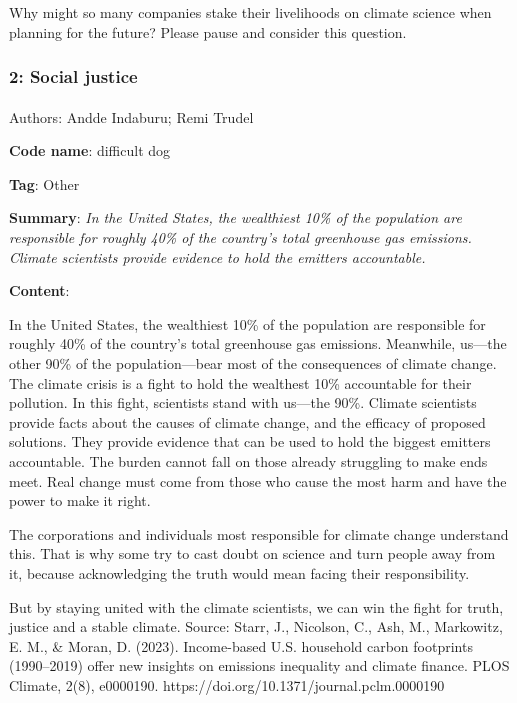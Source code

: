 \documentclass[
  letterpaper,
  DIV=11,
  numbers=noendperiod]{scrartcl}
\makeatletter
\let\oldparagraph\paragraph
\renewcommand{\paragraph}{
    \@ifstar
      \xxxParagraphStar
      \xxxParagraphNoStar
  }
\newcommand{\xxxParagraphStar}[1]{\oldparagraph*{#1}\mbox{}}
\newcommand{\xxxParagraphNoStar}[1]{\oldparagraph{#1}\mbox{}}
\makeatother
\begin{document}
Why might so many companies stake their livelihoods on climate science
when planning for the future? Please pause and consider this question.

\subsubsection{2: Social justice}\label{social-justice}

\paragraph{Authors: Andde Indaburu; Remi
Trudel}\label{authors-andde-indaburu-remi-trudel}

\textbf{Code name}: difficult dog

\textbf{Tag}: Other

\textbf{Summary}: \emph{In the United States, the wealthiest 10\% of the
population are responsible for roughly 40\% of the country's total
greenhouse gas emissions. Climate scientists provide evidence to hold
the emitters accountable.}

\textbf{Content}:

In the United States, the wealthiest 10\% of the population are
responsible for roughly 40\% of the country's total greenhouse gas
emissions. Meanwhile, us---the other 90\% of the population---bear most
of the consequences of climate change. The climate crisis is a fight to
hold the wealthest 10\% accountable for their pollution. In this fight,
scientists stand with us---the 90\%. Climate scientists provide facts
about the causes of climate change, and the efficacy of proposed
solutions. They provide evidence that can be used to hold the biggest
emitters accountable. The burden cannot fall on those already struggling
to make ends meet. Real change must come from those who cause the most
harm and have the power to make it right.

The corporations and individuals most responsible for climate change
understand this. That is why some try to cast doubt on science and turn
people away from it, because acknowledging the truth would mean facing
their responsibility.

But by staying united with the climate scientists, we can win the fight
for truth, justice and a stable climate. Source:
\hspace{0pt}\hspace{0pt}Starr, J., Nicolson, C., Ash, M., Markowitz, E.
M., \& Moran, D. (2023). Income-based U.S. household carbon footprints
(1990--2019) offer new insights on emissions inequality and climate
finance. PLOS Climate, 2(8), e0000190.
https://doi.org/10.1371/journal.pclm.0000190
\end{document}
